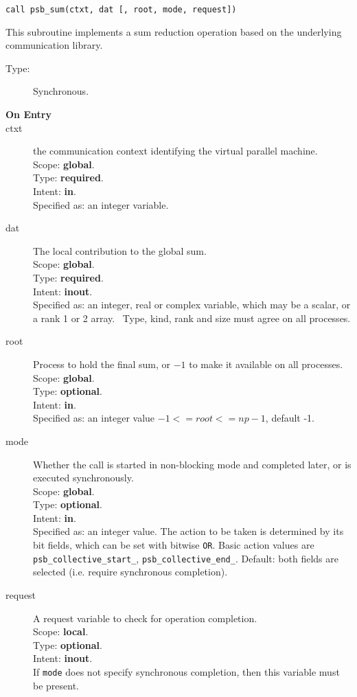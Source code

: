 \begin{verbatim}
call psb_sum(ctxt, dat [, root, mode, request])
\end{verbatim}

This subroutine implements a sum reduction  operation based on the
underlying communication library. 
\begin{description}
\item[Type:] Synchronous.
\item[\bf  On Entry ]
\item[ctxt] the communication context identifying the virtual
  parallel machine.\\
Scope: {\bf global}.\\
Type: {\bf required}.\\
Intent: {\bf in}.\\
Specified as: an integer variable.
\item[dat] The local contribution to the global sum.\\
Scope: {\bf global}.\\
Type: {\bf required}.\\
Intent: {\bf inout}.\\
Specified as: an integer, real or complex variable, which may be a
scalar, or a rank 1 or 2 array. \
Type, kind, rank and size must agree on all processes.
\item[root] Process to hold the final sum, or $-1$ to make it available
  on all processes.\\
Scope: {\bf global}.\\
Type: {\bf optional}.\\
Intent: {\bf in}.\\
Specified as: an integer value $-1<= root <= np-1$, default -1. \
\item[mode] Whether the call is started in non-blocking mode and completed
  later, or is executed synchronously.\\
Scope: {\bf global}.\\
Type: {\bf optional}.\\
Intent: {\bf in}.\\
Specified as: an integer value. The action to be taken is determined
by its bit fields, which can be set with bitwise \verb|OR|. Basic
action values are \verb|psb_collective_start_|, \verb|psb_collective_end_|.
Default:  both fields are selected (i.e. require synchronous completion).\\
\item[request] A request variable to check for operation completion.\\
Scope: {\bf local}.\\
Type: {\bf optional}.\\
Intent: {\bf inout}.\\
If \verb|mode| does not specify synchronous completion, then this
variable must be present.
\end{description}

